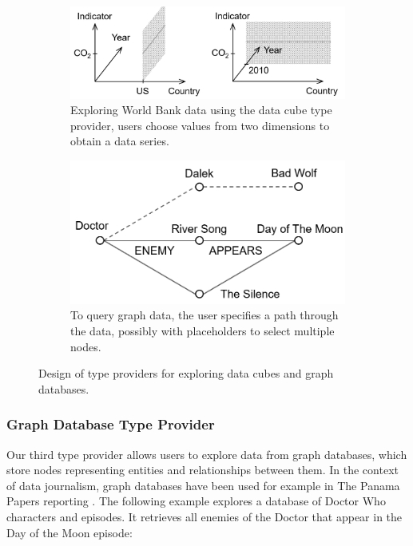 \documentclass[manuscript,review,anonymous]{acmart}
\begin{document}
\begin{figure}
\centering
\begin{subfigure}[b]{0.5\textwidth}
  \centering
  \includegraphics[scale=0.25]{figures/cubetp}
  \vspace{0.5em}
  \caption{Exploring World Bank data using the data cube type provider, users
    choose values from two dimensions to obtain a data series.}
  \label{fig:cubetp}
\end{subfigure}
\hfill
\begin{subfigure}[b]{0.45\textwidth}
  \centering
  \includegraphics[scale=0.28]{figures/graphtp}
  \caption{To query graph data, the user specifies a path through the data, possibly with
    placeholders to select multiple nodes.}
  \label{fig:graphtp}
\end{subfigure}
\vspace{-0.5em}
\caption{Design of type providers for exploring data cubes and graph databases.}
\label{fig:tps}
\end{figure}


\subsubsection*{Graph Database Type Provider}
Our third type provider allows users to explore data from graph databases, which store
nodes representing entities and relationships between them. In the context of data journalism,
graph databases have been used for example in The Panama Papers reporting \cite{panama}.
The following example explores a database of Doctor Who characters and episodes. It retrieves
all enemies of the Doctor that appear in the Day of the Moon episode:
\end{document}
